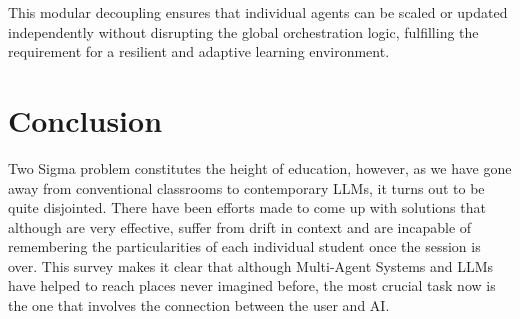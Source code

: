 \documentclass[conference]{IEEEtran}
\begin{document}
This modular decoupling ensures that individual agents can be scaled or updated independently without disrupting the global orchestration logic, fulfilling the requirement for a resilient and adaptive learning environment.



\section*{Conclusion}
Two Sigma problem constitutes the height of education, however, as we have gone away from conventional classrooms to contemporary LLMs, it turns out to be quite disjointed. There have been efforts made to come up with solutions that although are very effective, suffer from drift in context and are incapable of remembering the particularities of each individual student once the session is over. This survey makes it clear that although Multi-Agent Systems and LLMs have helped to reach places never imagined before, the most crucial task now is the one that involves the connection between the user and AI.

\printbibliography
\end{document}
